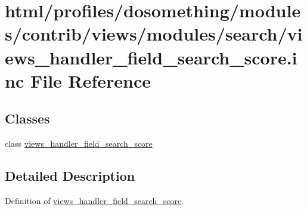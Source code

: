 \hypertarget{views__handler__field__search__score_8inc}{
\section{html/profiles/dosomething/modules/contrib/views/modules/search/views\_\-handler\_\-field\_\-search\_\-score.inc File Reference}
\label{views__handler__field__search__score_8inc}
}
\subsection*{Classes}
\begin{DoxyCompactItemize}
\item 
class \hyperlink{classviews__handler__field__search__score}{views\_\-handler\_\-field\_\-search\_\-score}
\end{DoxyCompactItemize}


\subsection{Detailed Description}
Definition of \hyperlink{classviews__handler__field__search__score}{views\_\-handler\_\-field\_\-search\_\-score}. 